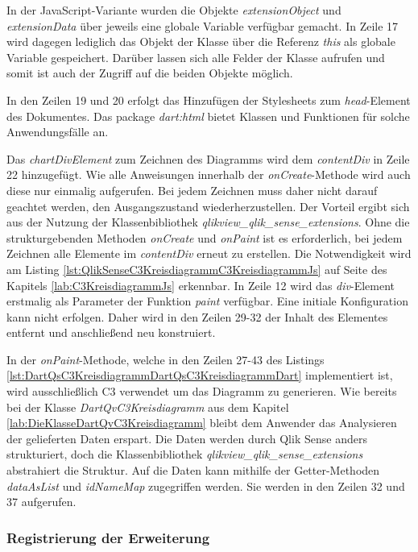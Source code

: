 In der JavaScript-Variante wurden die Objekte \textit{extensionObject} und \textit{extensionData} über jeweils eine globale Variable verfügbar gemacht. In Zeile 17 wird dagegen lediglich das Objekt der Klasse über die Referenz \textit{this} als globale Variable gespeichert. Darüber lassen sich alle Felder der Klasse aufrufen und somit ist auch der Zugriff auf die beiden Objekte möglich.

In den Zeilen 19 und 20 erfolgt das Hinzufügen der Stylesheets zum \textit{head}-Element des Dokumentes. Das package \textit{dart:html} bietet Klassen und Funktionen für solche Anwendungsfälle an. 

Das \textit{chartDivElement} zum Zeichnen des Diagramms wird dem \textit{contentDiv} in Zeile 22 hinzugefügt. Wie alle Anweisungen innerhalb der \textit{onCreate}-Methode wird auch diese nur einmalig aufgerufen. Bei jedem Zeichnen muss daher nicht darauf geachtet werden, den Ausgangszustand wiederherzustellen. Der Vorteil ergibt sich aus der Nutzung der Klassen\-bibliothek \textit{qlikview\_qlik\_sense\_extensions}. Ohne die strukturgebenden Methoden \textit{onCreate} und \textit{onPaint} ist es erforderlich, bei jedem Zeichnen alle Elemente im \textit{contentDiv} erneut zu erstellen. Die Notwendig\-keit wird am Listing \ref{lst:QlikSenseC3KreisdiagrammC3KreisdiagrammJs} auf Seite \pageref{lst:QlikSenseC3KreisdiagrammC3KreisdiagrammJs} des Kapitels \ref{lab:C3KreisdiagrammJs} erkennbar. In Zeile 12 wird das \textit{div}-Element erstmalig als Parameter der Funktion \textit{paint} verfügbar. Eine initiale Konfiguration kann nicht erfolgen. Daher wird in den Zeilen 29-32 der Inhalt des Elementes entfernt und anschließend neu konstruiert.

In der \textit{onPaint}-Methode, welche in den Zeilen 27-43 des Listings \ref{lst:DartQsC3KreisdiagrammDartQsC3KreisdiagrammDart} implementiert ist, wird ausschließlich C3 verwendet um das Diagramm zu generieren. Wie bereits bei der Klasse \textit{DartQvC3Kreisdiagramm} aus dem Kapitel \ref{lab:DieKlasseDartQvC3Kreisdiagramm} bleibt dem Anwender das Analysieren der gelieferten Daten erspart. Die Daten werden durch Qlik Sense anders strukturiert, doch die Klassen\-bibliothek \textit{qlikview\_qlik\_sense\_extensions} abstrahiert die Struktur. Auf die Daten kann mithilfe der Getter-Methoden \textit{dataAsList} und \textit{idNameMap} zugegriffen werden. Sie werden in den Zeilen 32 und 37 aufgerufen. 


\subsubsection{Registrierung der Erweiterung}


